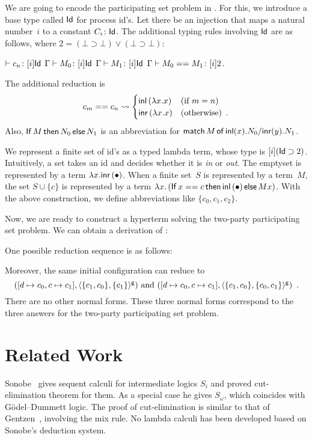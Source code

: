 {We are going to encode the participating set problem in \lgd.
For this, we introduce a base type called $\mathsf{Id}$ for process id's.
Let there be an injection that maps a natural number~$i$ to a constant
$C_i\colon\mathsf{Id}$.
The additional typing rules involving $\mathsf{Id}$ are as follows, where $2 = (\bot\supset\bot)\vee(\bot\supset\bot)$:
\begin{center}
 \UnaryRule{}{}
 {$\vdash {c_n} \colon{[i]\mathsf{Id}}$}
 \hfill
 \BinaryRule
 {$\Gamma\vdash {M_0} \colon{[}i]\mathsf{Id}$}
 {$\Gamma\vdash {M_1} \colon{[}i]\mathsf{Id}$}
 {}
 {$\Gamma \vdash {{M_0} == {M_1}} \colon{[i]2}$}\enspace.
\end{center}
The additional reduction is
\[
 c_m == c_n \rightsquigarrow
\begin{cases}
 \mathsf{inl}\left({\lambda x.x}\right)& (\text{if } m = n)\\
 \mathsf{inr}\left({\lambda x.x}\right)& (\text{otherwise})\enspace.
\end{cases}
\]
Also,
${\mathsf{If}\, {M}\, \mathsf{then}\, {N_0}\, \mathsf{else}\, {N_1}}$
is an abbreviation for
${\mathsf{match}\,{M}\,\mathsf{of}\, \mathsf{inl}({x}). {N_0}/ \mathsf{inr}({y}). {N_1}}$.

We represent a finite set of id's as a
typed lambda term, whose type is $[i](\mathsf{Id}\supset 2)$.  Intuitively, a
set takes an id and decides whether it is \textit{in} or \textit{out}.
The emptyset is represented by a term $\lambda x. \mathsf{inr}\left({\bullet}\right)$.
When a finite set~$S$ is represented by a term~$M$,
the set $S \cup \{c\}$ is represented by a term
$\lambda x.\left(\mathsf{If}\, {x==c}\, \mathsf{then}\, {\mathsf{inl}\left({\bullet}\right)}\, \mathsf{else}\, {Mx}\right)$.
With the above construction, we define abbreviations
like $\{c_0, c_1, c_2\}$.

Now, we are ready to construct a hyperterm solving the two-party
participating set problem.
We can obtain a derivation of :

One possible reduction sequence is as follows: 

Moreover, the same initial configuration can reduce to
\[
 ({[d\mapsto c_0,c\mapsto c_1]},{\langle{\{c_1,c_0\},
 \{c_1\}}\rangle^{\mathsf{g}}})\text{ and }
 ({[d\mapsto c_0,c\mapsto c_1]},{\langle{\{c_1,c_0\},
 \{c_0, c_1\}}\rangle^{\mathsf{g}}})\enspace.
\]
There are no other normal forms.
These three normal forms correspond to the three answers for the
two-party participating set problem.

\section{Related Work}
\label{related}
Sonobe~\cite{sonobe} gives sequent calculi for intermediate logics $S_i$
and proved cut-elimination theorem for them.  As a special case he gives
$S_\omega$, which coincides with G\"odel--Dummett logic.
The proof of cut-elimination is similar to that of
Gentzen~\cite{gentzen}, involving the mix rule.
No lambda calculi has been developed based on Sonobe's deduction system.

}
